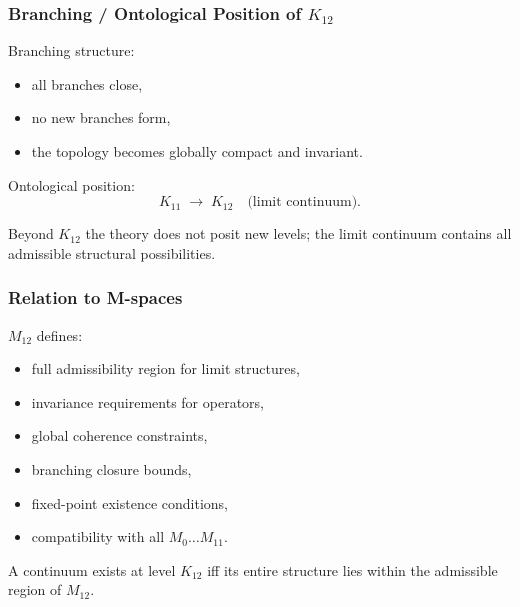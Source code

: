 \subsubsection{Branching / Ontological Position of $K_{12}$}

Branching structure:
\begin{itemize}
    \item all branches close,
    \item no new branches form,
    \item the topology becomes globally compact and invariant.
\end{itemize}

Ontological position:
\[
K_{11} \;\longrightarrow\; K_{12} \quad \text{(limit continuum)}.
\]

Beyond $K_{12}$ the theory does not posit new levels; the limit continuum
contains all admissible structural possibilities.

\subsubsection{Relation to M-spaces}

$M_{12}$ defines:
\begin{itemize}
    \item full admissibility region for limit structures,
    \item invariance requirements for operators,
    \item global coherence constraints,
    \item branching closure bounds,
    \item fixed-point existence conditions,
    \item compatibility with all $M_0\dots M_{11}$.
\end{itemize}

A continuum exists at level $K_{12}$ iff its entire structure lies within the
admissible region of $M_{12}$.
